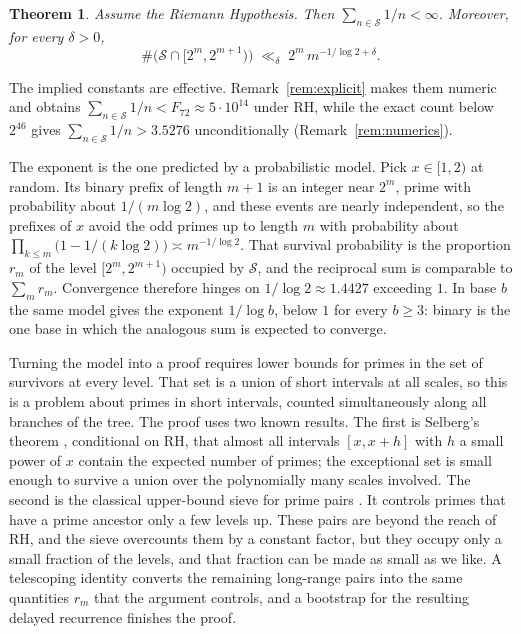 \documentclass[11pt]{amsart}
\newtheorem*{theoremA}{Theorem}
\newcommand{\Sset}{\mathcal{S}}
\begin{document}
\begin{theoremA}
Assume the Riemann Hypothesis. Then $\sum_{n \in \Sset} 1/n < \infty$.
Moreover, for every $\delta > 0$,
\[
\#\bigl(\Sset \cap [2^m, 2^{m+1})\bigr) \;\ll_\delta\; 2^m\, m^{-1/\log 2 + \delta}.
\]
\end{theoremA}

The implied constants are effective. Remark~\ref{rem:explicit} makes
them numeric and obtains $\sum_{n \in \Sset} 1/n < F_{72} \approx 5 \cdot
10^{14}$
under RH, while the exact count below $2^{46}$ gives $\sum_{n \in \Sset}
1/n > 3.5276$ unconditionally (Remark~\ref{rem:numerics}).

The exponent is the one predicted by a probabilistic model. Pick $x \in
[1,2)$ at random. Its binary prefix of length $m+1$ is an integer near
$2^m$, prime with probability about $1/(m \log 2)$, and these events are
nearly independent, so the prefixes of $x$ avoid the odd primes up to
length $m$ with probability about $\prod_{k \le m}\bigl(1 - 1/(k\log 2)\bigr)
\asymp m^{-1/\log 2}$. That survival probability is the proportion $r_m$
of the level $[2^m, 2^{m+1})$ occupied by $\Sset$, and the reciprocal sum
is comparable to $\sum_m r_m$. Convergence therefore hinges on $1/\log 2
\approx 1.4427$ exceeding $1$. In base $b$ the same model gives the
exponent $1/\log b$, below $1$ for every $b \ge 3$: binary is the one base
in which the analogous sum is expected to converge.

Turning the model into a proof requires lower bounds for primes in the
set of survivors at every level. That set is a union of short intervals
at all scales, so this is a problem about primes in short intervals,
counted simultaneously along all branches of the tree. The proof uses
two known results. The first is Selberg's theorem \cite{Sel}, conditional on RH, that
almost all intervals $[x, x+h]$ with $h$ a small power of $x$ contain the
expected number of primes; the exceptional set is small enough to survive
a union over the polynomially many scales involved. The second is the
classical upper-bound sieve for prime pairs \cite{HR}. It controls primes
that have a prime ancestor only a few levels up. These pairs are beyond
the reach of RH, and the sieve overcounts them by a constant factor, but
they occupy only a small fraction of the levels, and that fraction can be
made as small as we like. A telescoping identity converts the remaining
long-range pairs into the same quantities $r_m$ that the argument
controls, and a bootstrap for the resulting delayed recurrence finishes
the proof.
\end{document}
